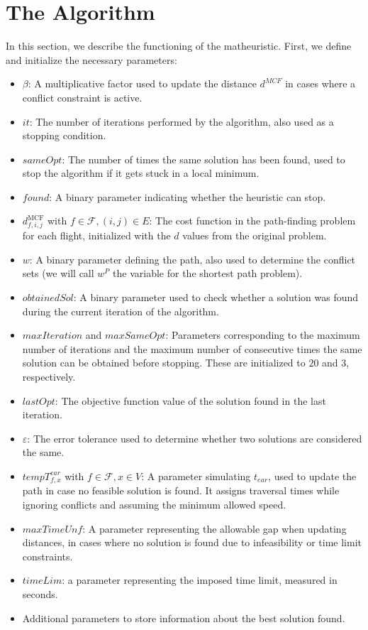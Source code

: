 \documentclass[../thesis.tex]{subfiles}
\begin{document}


\section{The Algorithm}\label{sec:alg:mathEuristicDescription}

In this section, we describe the functioning of the matheuristic.  
First, we define and initialize the necessary parameters:

\begin{itemize}
    \item $\beta$: A multiplicative factor used to update the distance $d^{MCF}$ in cases where a conflict constraint is active.
    \item $it$: The number of iterations performed by the algorithm, also used as a stopping condition.
    \item $sameOpt$: The number of times the same solution has been found, used to stop the algorithm if it gets stuck in a local minimum.
    \item $found$: A binary parameter indicating whether the heuristic can stop.
    \item $d^\text{MCF}_{f,i,j}$ with $f\in \mathcal F, (i,j)\in E$: The cost function in the path-finding problem for each flight, initialized with the $d$ values from the original problem.
    \item $w$: A binary parameter defining the path, also used to determine the conflict sets (we will call $w^P$ the variable for the shortest path problem).
    \item $obtainedSol$: A binary parameter used to check whether a solution was found during the current iteration of the algorithm.
    \item $maxIteration$ and $maxSameOpt$: Parameters corresponding to the maximum number of iterations and the maximum number of consecutive times the same solution can be obtained before stopping. These are initialized to $20$ and $3$, respectively.
    \item $lastOpt$: The objective function value of the solution found in the last iteration.
    \item $\varepsilon$: The error tolerance used to determine whether two solutions are considered the same.
    \item $tempT^{ear}_{f,x}$ with $f\in\mathcal F, x \in V$: A parameter simulating $t_{ear}$, used to update the path in case no feasible solution is found. It assigns traversal times while ignoring conflicts and assuming the minimum allowed speed.
    \item $maxTimeUnf$: A parameter representing the allowable gap when updating distances, in cases where no solution is found due to infeasibility or time limit constraints.
    \item $timeLim$: a parameter representing the imposed time limit, measured in seconds.
    \item Additional parameters to store information about the best solution found.
\end{itemize}
\end{document}

